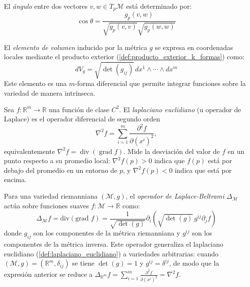 \begin{definition}\label{def:angulos_variedades}
El \textit{ángulo} entre dos vectores $v, w \in T_p\mathcal{M}$ está determinado por:
\[
\cos\theta = \frac{g_p(v,w)}{\sqrt{g_p(v,v)}\sqrt{g_p(w,w)}}
\]
\end{definition}

\begin{definition}\label{def:elemento_volumen}
El \textit{elemento de volumen} inducido por la métrica $g$ se expresa en coordenadas locales mediante el producto exterior (\autoref{def:producto_exterior_k_formas}) como:
\[
dV_g = \sqrt{\det(g_{ij})} \, dx^1 \wedge \cdots \wedge dx^m
\]
Este elemento es una $m$-forma diferencial que permite integrar funciones sobre la variedad de manera intrínseca.
\end{definition}

\begin{definition}\label{def:laplaciano_euclidiano}
Sea $f: \mathbb{R}^m \to \mathbb{R}$ una función de clase $C^2$. El \textit{laplaciano euclidiano} (u operador de Laplace) es el operador diferencial de segundo orden
\[
\nabla^2 f = \sum_{i=1}^{m} \frac{\partial^2 f}{\partial (x^i)^2},
\]
equivalentemente $\nabla^2 f = \operatorname{div}(\operatorname{grad} f)$. Mide la desviación del valor de $f$ en un punto respecto a su promedio local: $\nabla^2 f(p) > 0$ indica que $f(p)$ está por debajo del promedio en un entorno de $p$, y $\nabla^2 f(p) < 0$ indica que está por encima.
\end{definition}

\begin{definition}\label{def:laplace_beltrami}
Para una variedad riemanniana $(\mathcal{M}, g)$, el \textit{operador de Laplace-Beltrami} $\Delta_\mathcal{M}$ actúa sobre funciones suaves $f: \mathcal{M} \to \mathbb{R}$ como:
\[
\Delta_\mathcal{M} f = \text{div}(\text{grad } f) = \frac{1}{\sqrt{\det(g)}} \partial_i\left(\sqrt{\det(g)} \, g^{ij} \partial_j f\right)
\]
donde $g_{ij}$ son los componentes de la métrica riemanniana y $g^{ij}$ son los componentes de la métrica inversa. Este operador generaliza el laplaciano euclidiano (\autoref{def:laplaciano_euclidiano}) a variedades arbitrarias: cuando $(\mathcal{M}, g) = (\mathbb{R}^m, \delta_{ij})$ se tiene $\det(g) = 1$ y $g^{ij} = \delta^{ij}$, de modo que la expresión anterior se reduce a $\Delta_{\mathbb{R}^m} f = \sum_{i=1}^{m} \frac{\partial^2 f}{\partial (x^i)^2} = \nabla^2 f$.
\end{definition}

